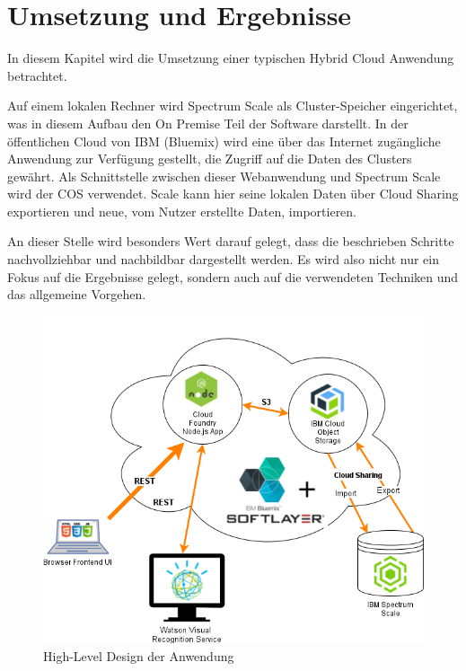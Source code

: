 \chapter{Umsetzung und Ergebnisse}\label{ch:realization}

In diesem Kapitel wird die Umsetzung einer typischen Hybrid Cloud Anwendung betrachtet. 

Auf einem lokalen Rechner wird Spectrum Scale als Cluster-Speicher eingerichtet, was in diesem Aufbau den \gls{On Premise} Teil der Software darstellt.
In der öffentlichen Cloud von IBM (Bluemix) wird eine über das Internet zugängliche Anwendung zur Verfügung gestellt, die Zugriff auf die Daten des Clusters gewährt. Als Schnittstelle zwischen dieser Webanwendung und Spectrum Scale wird der \ac{COS} verwendet. Scale kann hier seine lokalen Daten über Cloud Sharing exportieren und neue, vom Nutzer erstellte Daten, importieren.

An dieser Stelle wird besonders Wert darauf gelegt, dass die beschrieben Schritte nachvollziehbar und nachbildbar dargestellt werden. Es wird also nicht nur ein Fokus auf die Ergebnisse gelegt, sondern auch auf die verwendeten Techniken und das allgemeine Vorgehen.

\begin{figure}[hbt]
	\centering
	\includegraphics[scale=0.7]{images/demo-architecture-overview}
	\caption{High-Level Design der Anwendung}
	\label{fig:demoarchitectureoverview}
\end{figure}

